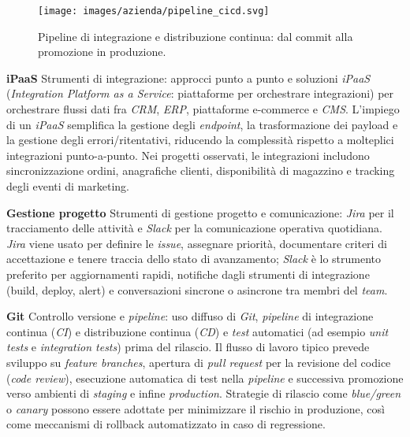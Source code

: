 \begin{figure}[htbp]
    \centering
    \texttt{[image: images/azienda/pipeline\_cicd.svg]}
    \caption{Pipeline di integrazione e distribuzione continua: dal commit alla promozione in produzione.}
    \label{fig:pipeline_cicd}
\end{figure}



\medskip
\noindent\textbf{iPaaS}
Strumenti di integrazione: approcci punto a punto e soluzioni \emph{iPaaS} (\emph{Integration Platform as a Service}: piattaforme per orchestrare integrazioni) 
per orchestrare flussi dati fra \emph{CRM}, \emph{ERP}, piattaforme e-commerce e \emph{CMS}. L’impiego di un \emph{iPaaS} semplifica la gestione degli \emph{endpoint}, 
la trasformazione dei payload e la gestione degli errori/ritentativi, riducendo la complessità rispetto a molteplici integrazioni punto-a-punto. Nei progetti osservati, 
le integrazioni includono sincronizzazione ordini, anagrafiche clienti, disponibilità di magazzino e tracking degli eventi di marketing.

\medskip
\noindent\textbf{Gestione progetto}
Strumenti di gestione progetto e comunicazione: \emph{Jira} per il tracciamento delle attività e \emph{Slack} per la comunicazione operativa quotidiana. \emph{Jira} 
viene usato per definire le \emph{issue}, assegnare priorità, documentare criteri di accettazione e tenere traccia dello stato di avanzamento; \emph{Slack} 
è lo strumento preferito per aggiornamenti rapidi, notifiche dagli strumenti di integrazione (build, deploy, alert) e conversazioni sincrone o asincrone tra membri del \emph{team}.

\medskip
\noindent\textbf{Git}
Controllo versione e \emph{pipeline}: uso diffuso di \emph{Git}, \emph{pipeline} di integrazione continua (\emph{CI}) e distribuzione continua (\emph{CD}) e \emph{test} 
automatici (ad esempio \emph{unit tests} e \emph{integration tests}) prima del rilascio. Il flusso di lavoro tipico prevede sviluppo su \emph{feature branches}, 
apertura di \emph{pull request} per la revisione del codice (\emph{code review}), esecuzione automatica di test nella \emph{pipeline} e successiva promozione verso 
ambienti di \emph{staging} e infine \emph{production}. Strategie di rilascio come \emph{blue/green} o \emph{canary} possono essere adottate per minimizzare il 
rischio in produzione, così come meccanismi di rollback automatizzato in caso di regressione.

